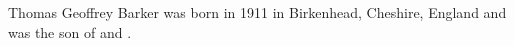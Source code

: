 
Thomas Geoffrey Barker was born in 1911 in Birkenhead, Cheshire, England and was the son of  and .


